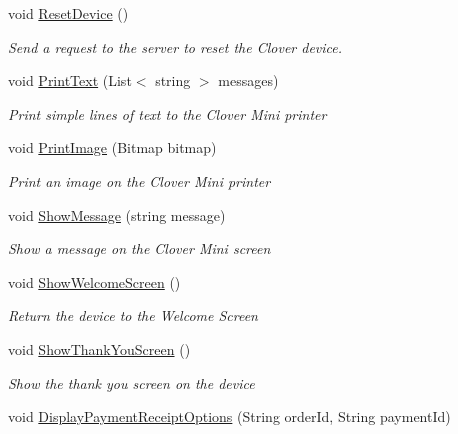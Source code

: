 \begin{DoxyCompactItemize}
void \hyperlink{interfacecom_1_1clover_1_1remotepay_1_1sdk_1_1_i_clover_connector_aafead472d6f0adc74084a229bf75e5ed}{Reset\+Device} ()
\begin{DoxyCompactList}\small\item\em Send a request to the server to reset the Clover device. \end{DoxyCompactList}\item 
void \hyperlink{interfacecom_1_1clover_1_1remotepay_1_1sdk_1_1_i_clover_connector_a16a2a91c231e7a66373b2c0e2f612951}{Print\+Text} (List$<$ string $>$ messages)
\begin{DoxyCompactList}\small\item\em Print simple lines of text to the Clover Mini printer \end{DoxyCompactList}\item 
void \hyperlink{interfacecom_1_1clover_1_1remotepay_1_1sdk_1_1_i_clover_connector_ac716d55882598b92984159f4898bbe2a}{Print\+Image} (Bitmap bitmap)
\begin{DoxyCompactList}\small\item\em Print an image on the Clover Mini printer \end{DoxyCompactList}\item 
void \hyperlink{interfacecom_1_1clover_1_1remotepay_1_1sdk_1_1_i_clover_connector_a2d4c2a87f772459bb1a494e2f87835a8}{Show\+Message} (string message)
\begin{DoxyCompactList}\small\item\em Show a message on the Clover Mini screen \end{DoxyCompactList}\item 
void \hyperlink{interfacecom_1_1clover_1_1remotepay_1_1sdk_1_1_i_clover_connector_a462fd3dbb5914ac1d5b906dd1daa57c0}{Show\+Welcome\+Screen} ()
\begin{DoxyCompactList}\small\item\em Return the device to the Welcome Screen \end{DoxyCompactList}\item 
void \hyperlink{interfacecom_1_1clover_1_1remotepay_1_1sdk_1_1_i_clover_connector_adb4f9a33f3316cb349a02d05e7ddf902}{Show\+Thank\+You\+Screen} ()
\begin{DoxyCompactList}\small\item\em Show the thank you screen on the device \end{DoxyCompactList}\item 
void \hyperlink{interfacecom_1_1clover_1_1remotepay_1_1sdk_1_1_i_clover_connector_ae60f9c25fa8cc54e3102fcde8ab0b869}{Display\+Payment\+Receipt\+Options} (String order\+Id, String payment\+Id)

\end{DoxyCompactItemize}
